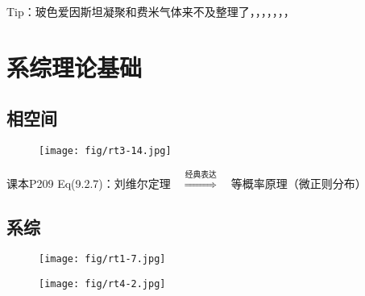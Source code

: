 \documentclass[UTF8,12pt]{ctexart}
\newcommand{\tgre}{\textcolor{green!75!black}}
\begin{document}
\tgre{Tip：玻色爱因斯坦凝聚和费米气体来不及整理了，，，，，，，}





\newpage
\section{系综理论基础}

\subsection{相空间}

\begin{figure}[H]
    {
    \begin{minipage}{10cm}
    \centering
    \texttt{[image: fig/rt3-14.jpg]}
    \end{minipage}\label{}
    }
\end{figure}

课本P209 Eq(9.2.7)：刘维尔定理$\quad\overset{\text{经典表达}}{\Longrightarrow}\quad$等概率原理（微正则分布）

\subsection{系综}

\begin{figure}[H]
    {
    \begin{minipage}{7cm}
    \centering
    \texttt{[image: fig/rt1-7.jpg]}
    \end{minipage}\label{}
    }
    {
    \begin{minipage}{9.3cm}
    \centering
    \texttt{[image: fig/rt4-2.jpg]}
    \end{minipage}\label{}
    }
\end{figure}

\begin{figure}[H]
\end{figure}
\end{document}
